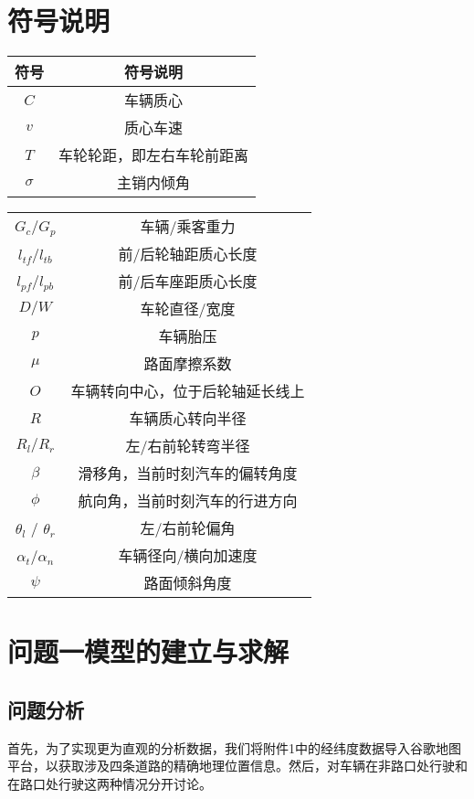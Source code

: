 \documentclass[withoutpreface,bwprint]{cumcmthesis} %
\begin{document}
\section{符号说明}
\begin{table}[htbp]
   \centering
   \begin{tabular}{cc}
   \toprule[2.5pt]
   符号 &  符号说明 \\
   \midrule[1pt]
   $C$ &车辆质心 \\
   $v$ & 质心车速 \\
   $T$ & 车轮轮距，即左右车轮前距离\quad\quad  \\
   $\sigma$ & 主销内倾角 \\
\end{tabular}
\end{table}

\begin{table}[htbp]
   \centering
   \begin{tabular}{cc}
  $G_{c}$/$G_{p}$ & 车辆/乘客重力  \\
  $l_{tf}$/$l_{tb}$ & 前/后轮轴距质心长度  \\
  $l_{pf}$/$l_{pb}$ & 前/后车座距质心长度  \\
  $D/W$ & 车轮直径/宽度\\
  $p$ & 车辆胎压 \\
  $\mu $& 路面摩擦系数 \\
  $O$ & 车辆转向中心，位于后轮轴延长线上  \\
  $R$ & 车辆质心转向半径  \\
  $R_l/R_r$ & 左/右前轮转弯半径 \\
  $\beta$ & 滑移角，当前时刻汽车的偏转角度 \\
  $\phi$ & 航向角，当前时刻汽车的行进方向\\
  $\theta_l$ / $\theta_r$ & 左/右前轮偏角  \\
  $\alpha_t$/$\alpha_n$ & 车辆径向/横向加速度 \\
  $\psi$ & 路面倾斜角度 \\
  \bottomrule[2.5pt]
\end{tabular}
\end{table}

\section{问题一模型的建立与求解}
\subsection{问题分析}
首先，为了实现更为直观的分析数据，我们将附件1中的经纬度数据导入谷歌地图平台，以获取涉及四条道路的精确地理位置信息。然后，对车辆在非路口处行驶和在路口处行驶这两种情况分开讨论。
\end{document}
